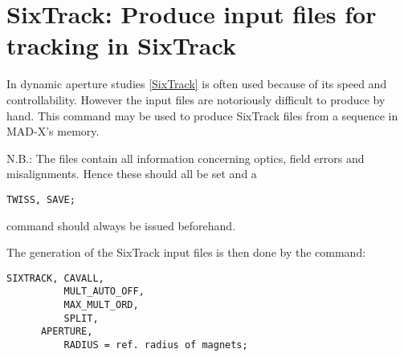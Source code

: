 
\chapter{SixTrack: Produce input files for tracking in SixTrack}

In dynamic aperture studies
\href{../Introduction/bibliography.html#SixTrack}{[SixTrack]} is often
used because of its  speed and controllability. However the input files
are notoriously difficult  to produce by hand. This command may be used
to produce SixTrack files from  a sequence in MAD-X's memory.  
 
 N.B.: The files contain all information concerning optics, field errors
 and misalignments. Hence these should all be set and a   
\begin{verbatim}
TWISS, SAVE;
\end{verbatim} 
command should always be issued beforehand.

 The generation of the SixTrack input files is then done by the command: 
\begin{verbatim}
SIXTRACK, CAVALL,
          MULT_AUTO_OFF,
          MAX_MULT_ORD,
          SPLIT,
	  APERTURE,
          RADIUS = ref. radius of magnets;
\end{verbatim} 


